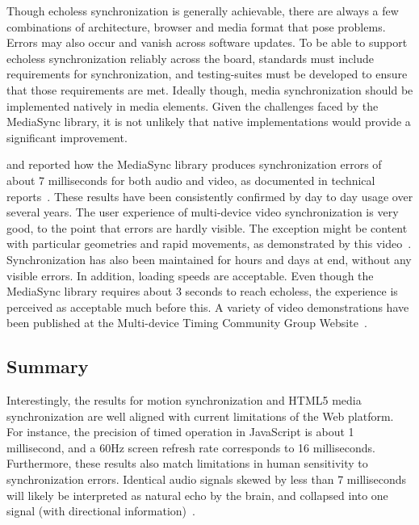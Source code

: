 Though echoless synchronization is generally achievable, there are always a
few combinations of architecture, browser and media format that pose problems.
Errors may also occur and vanish across software updates. To be able to
support echoless synchronization reliably across the board, standards must
include requirements for synchronization, and testing-suites must be developed
to ensure that those requirements are met. Ideally though, media
synchronization should be implemented natively in media elements. Given the
challenges faced by the MediaSync library, it is not unlikely that native
implementations would provide a significant improvement.




and reported how the MediaSync library produces synchronization
errors of about 7 milliseconds for both audio and video, as documented in
technical reports~\cite{syncreport1,syncreport2}. These results have been consistently
confirmed by day to day usage over several years. The user experience of
multi-device video synchronization is very good, to the point that errors are
hardly visible. The exception might be content with particular geometries and
rapid movements, as demonstrated by this video~\cite{carneval}. Synchronization
has also been maintained for hours and days at end, without any visible
errors. In addition, loading speeds are acceptable. Even though the MediaSync
library requires about 3 seconds to reach echoless, the experience is
perceived as acceptable much before this. A variety of video demonstrations
have been published at the Multi-device Timing Community Group
Website~\cite{mtcg}.


\subsection {Summary}




Interestingly, the results for motion synchronization and HTML5 media
synchronization are well aligned with current limitations of the Web platform.
For instance, the precision of timed operation in JavaScript is about 1
millisecond, and a 60Hz screen refresh rate corresponds to 16 milliseconds.
Furthermore, these results also match limitations in human sensitivity to
synchronization errors. Identical audio signals skewed by less than 7
milliseconds will likely be interpreted as natural echo by the brain, and
collapsed into one signal (with directional information)~\cite{syncreport2}.

